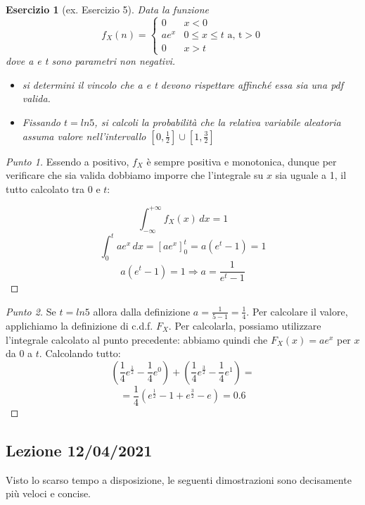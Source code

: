 \documentclass[12pt]{article}
\newtheorem{theorem}{Esercizio}
\renewcommand\qedsymbol{$\square$}
\begin{document}
\begin{theorem}[ex. Esercizio 5]
Data la funzione
$$
f_X(n) = \begin{cases} 0 & x < 0 \\ a e^x & 0 \le x \le t \mbox{   a, t} > 0 \\ 0 & x > t \end{cases}
$$
dove a e t sono parametri non negativi.
\begin{itemize}
    \item si determini il vincolo che a e t devono rispettare affinché essa sia una pdf valida.
    \item Fissando $t = ln 5$, si calcoli la probabilità che la relativa variabile aleatoria assuma valore nell’intervallo $[0, \frac{1}{2}] \cup [1, \frac{3}{2}]$  
\end{itemize}
\end{theorem}

\renewcommand\qedsymbol{$\square$}

\begin{proof}[Punto 1]
Essendo a positivo, $f_X$ è sempre positiva e monotonica, dunque per verificare che sia valida dobbiamo imporre che l’integrale su $x$ sia uguale a 1, il tutto calcolato tra $0$ e $t$:

$$
\int_{-\infty}^{+\infty} f_X(x) \,dx = 1
$$
$$
\int_{0}^{t} a e^x \,dx = [a e^x]^t_0 = a(e^t - 1) = 1
$$
$$
a(e^t - 1) = 1 \Longrightarrow a = \frac{1}{e^t - 1}
$$

\end{proof}

\renewcommand\qedsymbol{$\blacksquare$}

\begin{proof}[Punto 2]
Se $t = ln 5$ allora dalla definizione $a = \frac{1}{5-1} = \frac{1}{4}$. Per calcolare il valore, applichiamo la definizione di c.d.f. $F_X$. Per calcolarla, possiamo utilizzare l'integrale calcolato al punto precedente: abbiamo quindi che $F_X(x) = a e^x$ per $x$ da $0$ a $t$. Calcolando tutto:
$$
(\frac{1}{4} e^{\frac{1}{2}} - \frac{1}{4} e^{0}) + (\frac{1}{4} e^{\frac{3}{2}} - \frac{1}{4} e^{1}) = 
$$
$$
= \frac{1}{4} (e^{\frac{1}{2}} - 1 + e^{\frac{3}{2}} - e) = 0.6
$$
\end{proof}

\subsection{Lezione 12/04/2021}

Visto lo scarso tempo a disposizione, le seguenti dimostrazioni sono decisamente più veloci e concise.
\end{document}
